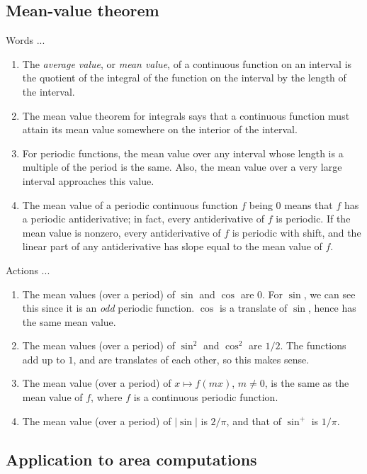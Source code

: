 \documentclass[10pt]{amsart}
\begin{document}
\subsection{Mean-value theorem}

Words ...

\begin{enumerate}
\item The {\em average value}, or {\em mean value}, of a continuous
  function on an interval is the quotient of the integral of the
  function on the interval by the length of the interval.
\item The mean value theorem for integrals says that a continuous
  function must attain its mean value somewhere on the interior of the
  interval.
\item For periodic functions, the mean value over any interval whose
  length is a multiple of the period is the same. Also, the mean value
  over a very large interval approaches this value.
\item The mean value of a periodic continuous function $f$ being $0$
  means that $f$ has a periodic antiderivative; in fact, every
  antiderivative of $f$ is periodic. If the mean value is nonzero,
  every antiderivative of $f$ is periodic with shift, and the linear
  part of any antiderivative has slope equal to the mean value of $f$.
\end{enumerate}

Actions ...

\begin{enumerate}
\item The mean values (over a period) of $\sin$ and $\cos$ are
  $0$. For $\sin$, we can see this since it is an {\em odd} periodic
  function. $\cos$ is a translate of $\sin$, hence has the same mean
  value.
\item The mean values (over a period) of $\sin^2$ and $\cos^2$ are
  $1/2$. The functions add up to $1$, and are translates of each
  other, so this makes sense.
\item The mean value (over a period) of $x \mapsto f(mx)$, $m \ne 0$,
  is the same as the mean value of $f$, where $f$ is a continuous
  periodic function.
\item The mean value (over a period) of $|\sin|$ is $2/\pi$, and that
  of $\sin^+$ is $1/\pi$.
\end{enumerate}

\subsection{Application to area computations}
\end{document}
